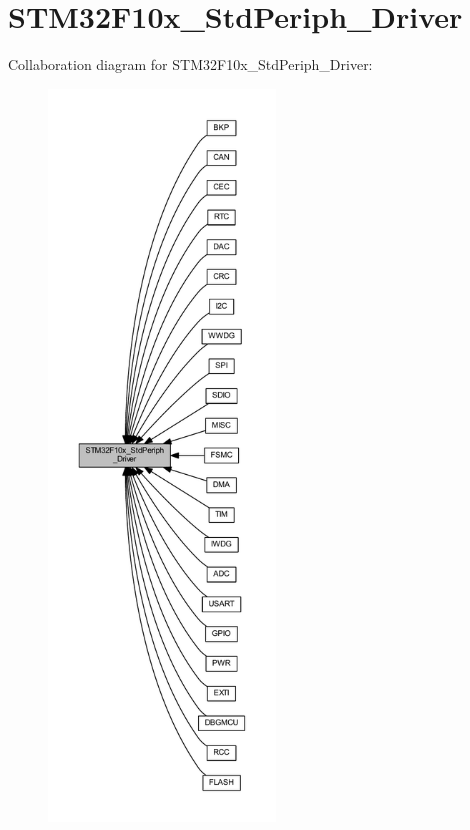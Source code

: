 \hypertarget{group___s_t_m32_f10x___std_periph___driver}{}\section{S\+T\+M32\+F10x\+\_\+\+Std\+Periph\+\_\+\+Driver}
\label{group___s_t_m32_f10x___std_periph___driver}
Collaboration diagram for S\+T\+M32\+F10x\+\_\+\+Std\+Periph\+\_\+\+Driver\+:
\nopagebreak
\begin{figure}[H]
\begin{center}
\leavevmode
\includegraphics[height=550pt]{group___s_t_m32_f10x___std_periph___driver}
\end{center}
\end{figure}
